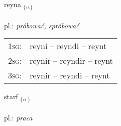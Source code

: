 \documentclass[frontgrid, backgrid]{flacards}\usepackage[]{graphicx}\usepackage[]{xcolor}
\begin{document}
\renewcommand{\flhead}{\vskip5pt \fboxsep=0pt {\small\bfseries\footnotesize Sagnorð | czasownik}}
\renewcommand{\fcfoot}{\vskip5pt \fboxsep=0pt \hspace{2pt}{\small\bfseries\footnotesize 1K}}

\renewcommand{\blhead}{\vskip5pt {\small\bfseries\footnotesize Sagnorð | czasownik }}
\renewcommand{\bcfoot}{\vskip5pt \hspace{2pt}{\small\bfseries\footnotesize 1K}}


{reyna \small{\textsubscript{(\textit{v.})}} \\[1ex] %
\textphonetic{[reiːna]} \\
pl.: \emph{próbować, spróbować} \\  [2ex]
\renewcommand*{\arraystretch}{0.8}
\begin{tabular}{p{1cm}l}
\textsc{1sg}: & reyni -- reyndi -- reynt \\ 
\textsc{2sg}: & reynir -- reyndir -- reynt \\ 
\textsc{3sg}: & reynir -- reyndi -- reynt \\ 
\end{tabular}
}

\renewcommand{\flhead}{\vskip5pt \fboxsep=0pt {\small\bfseries\footnotesize Nafnorð | rzeczownik}}
\renewcommand{\fcfoot}{\vskip5pt \fboxsep=0pt \hspace{2pt}{\small\bfseries\footnotesize 1K}}

\renewcommand{\blhead}{\vskip5pt {\small\bfseries\footnotesize Nafnorð | rzeczownik }}
\renewcommand{\bcfoot}{\vskip5pt \hspace{2pt}{\small\bfseries\footnotesize 1K}}


{starf \small{\textsubscript{(\textit{n.})}} \\[1ex] %
\textphonetic{[starv]} \\
pl.: \emph{praca} \\  [2ex]
\renewcommand*{\arraystretch}{0.8}
}
\end{document}
